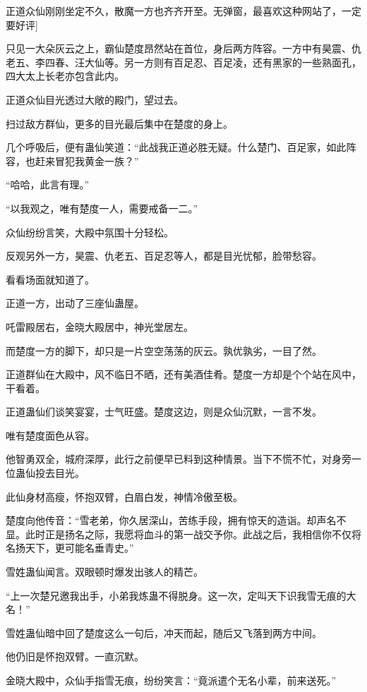 
\begin{this_body}

正道众仙刚刚坐定不久，散魔一方也齐齐开至。无弹窗，最喜欢这种网站了，一定要好评]

只见一大朵灰云之上，霸仙楚度昂然站在首位，身后两方阵容。一方中有昊震、仇老五、李四春、汪大仙等。另一方则有百足忍、百足凌，还有黑家的一些熟面孔，四大太上长老亦包含此内。

正道众仙目光透过大敞的殿门，望过去。

扫过敌方群仙，更多的目光最后集中在楚度的身上。

几个呼吸后，便有蛊仙笑道：“此战我正道必胜无疑。什么楚门、百足家，如此阵容，也赶来冒犯我黄金一族？”

“哈哈，此言有理。”

“以我观之，唯有楚度一人，需要戒备一二。”

众仙纷纷言笑，大殿中氛围十分轻松。

反观另外一方，昊震、仇老五、百足忍等人，都是目光忧郁，脸带愁容。

看看场面就知道了。

正道一方，出动了三座仙蛊屋。

吒雷殿居右，金晓大殿居中，神光堂居左。

而楚度一方的脚下，却只是一片空空荡荡的灰云。孰优孰劣，一目了然。

正道群仙在大殿中，风不临日不晒，还有美酒佳肴。楚度一方却是个个站在风中，干看着。

正道蛊仙们谈笑宴宴，士气旺盛。楚度这边，则是众仙沉默，一言不发。

唯有楚度面色从容。

他智勇双全，城府深厚，此行之前便早已料到这种情景。当下不慌不忙，对身旁一位蛊仙投去目光。

此仙身材高瘦，怀抱双臂，白眉白发，神情冷傲至极。

楚度向他传音：“雪老弟，你久居深山，苦练手段，拥有惊天的造诣。却声名不显。此时正是扬名之际，我愿将血斗的第一战交予你。此战之后，我相信你不仅将名扬天下，更可能名垂青史。”

雪姓蛊仙闻言。双眼顿时爆发出骇人的精芒。

“上一次楚兄邀我出手，小弟我炼蛊不得脱身。这一次，定叫天下识我雪无痕的大名！”

雪姓蛊仙暗中回了楚度这么一句后，冲天而起，随后又飞落到两方中间。

他仍旧是怀抱双臂。一直沉默。

金晓大殿中，众仙手指雪无痕，纷纷笑言：“竟派遣个无名小辈，前来送死。”


\end{this_body}
